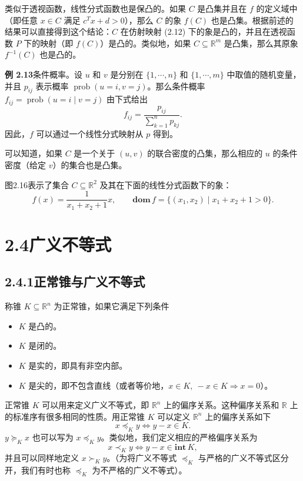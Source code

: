 \documentclass[UTF8, 12pt, fontset=fandol, oneside]{ctexart}
\begin{document}
类似于透视函数，线性分式函数也是保凸的。如果 $C$ 是凸集并且在 $f$ 的定义域中（即任意 $x\in C$ 满足 $c^Tx+d>0$），那么 $C$ 的象 $f(C)$ 也是凸集。根据前述的结果可以直接得到这个结论：$C$ 在仿射映射 (2.12) 下的象是凸的，并且在透视函数 $P$ 下的映射（即 $f(C)$）是凸的。类似地，如果 $C\subseteq\mathbb{R}^m$ 是凸集，那么其原象 $f^{-1}(C)$ 也是凸的。

\noindent\textbf{例 2.13}\quad 条件概率。设 $u$ 和 $v$ 是分别在 $\{1,\cdots,n\}$ 和 $\{1,\cdots,m\}$ 中取值的随机变量，并且 $p_{ij}$ 表示概率 $\operatorname{prob}(u=i,v=j)$。那么条件概率 $f_{ij}=\operatorname{prob}(u=i\mid v=j)$ 由下式给出
\[
  f_{ij}=\frac{p_{ij}}{\sum_{k=1}^n p_{kj}}.
\]
因此，$f$ 可以通过一个线性分式映射从 $p$ 得到。

可以知道，如果 $C$ 是一个关于 $(u,v)$ 的联合密度的凸集，那么相应的 $u$ 的条件密度（给定 $v$）的集合也是凸集。

图2.16表示了集合 $C\subseteq\mathbb{R}^2$ 及其在下面的线性分式函数下的象：
\[
  f(x)=\frac{1}{x_1+x_2+1}x,\qquad
  \mathbf{dom}\,f=\{(x_1,x_2)\mid x_1+x_2+1>0\}.
\]

\section*{2.4\quad 广义不等式}

\subsection*{2.4.1\quad 正常锥与广义不等式}

称锥 $K\subseteq\mathbb{R}^n$ 为正常锥，如果它满足下列条件
\begin{itemize}
  \item $K$ 是凸的。
  \item $K$ 是闭的。
  \item $K$ 是实的，即具有非空内部。
  \item $K$ 是尖的，即不包含直线（或者等价地，$x\in K,\ -x\in K\Longrightarrow x=0$）。
\end{itemize}
正常锥 $K$ 可以用来定义广义不等式，即 $\mathbb{R}^n$ 上的偏序关系。这种偏序关系和 $\mathbb{R}$ 上的标准序有很多相同的性质。用正常锥 $K$ 可以定义 $\mathbb{R}^n$ 上的偏序关系如下
\[
  x\preceq_K y\Longleftrightarrow y-x\in K.
\]
$y\succeq_K x$ 也可以写为 $x\preceq_K y$。类似地，我们定义相应的严格偏序关系为
\[
  x\prec_K y\Longleftrightarrow y-x\in\mathbf{int}\,K,
\]
并且可以同样地定义 $x\succ_K y$。（为将广义不等式 $\preceq_K$ 与严格的广义不等式区分开，我们有时也称 $\preceq_K$ 为不严格的广义不等式）。
\end{document}
